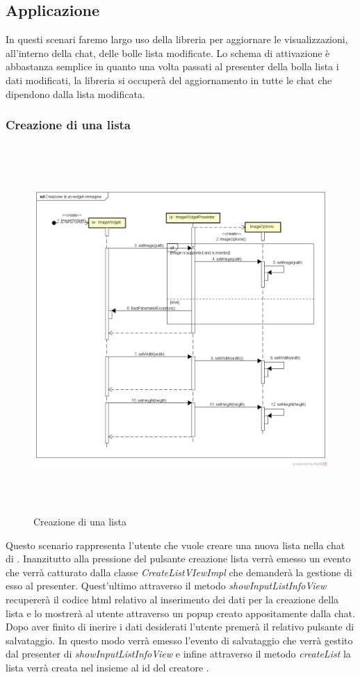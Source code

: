 \newpage
\subsection{Applicazione}
In questi scenari faremo largo uso della libreria per aggiornare le visualizzazioni, all'interno della chat, delle bolle lista modificate. Lo schema di attivazione è abbastanza semplice in quanto una volta passati al presenter della bolla lista i dati modificati, la libreria  si occuperà del aggiornamento in tutte le chat che dipendono dalla lista modificata.
\subsubsection{Creazione di una lista}

\label{Creazione di una lista}
\begin{figure}[ht]
	\centering
	\includegraphics[width=16cm, height=14cm]{Sezioni/Diagrammi/img/Creazione di un widget immagine.png}
	\caption{Creazione di una lista}
\end{figure}

Questo scenario rappresenta l'utente che vuole creare una nuova lista nella chat di . Inanzitutto alla pressione del pulsante creazione lista verrà emesso un evento che verrà catturato dalla classe \textit{CreateListVIewImpl} che demanderà la gestione di esso al presenter. Quest'ultimo attraverso il metodo \textit{showInputListInfoView} recupererà il codice html relativo al inserimento dei dati per la creazione della lista e lo mostrerà al utente attraverso un popup creato appositamente dalla chat. Dopo aver finito di inerire i dati desiderati l'utente premerà il relativo pulsante di salvataggio. In questo modo verrà emesso l'evento di salvataggio che verrà gestito dal presenter di \textit{showInputListInfoView} e infine attraverso il metodo \textit{createList} la lista verrà creata nel  insieme al id del creatore .



